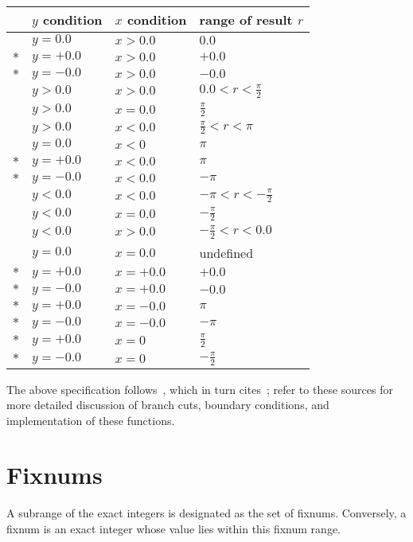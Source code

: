 \begin{center}
\begin{tabular}{clll}
& $y$ condition & $x$ condition & range of result $r$\\\hline
& $y = 0.0$ & $x > 0.0$ & $0.0$\\
$\ast$ & $y = +0.0$  & $x > 0.0$ & $+0.0$\\	
$\ast$ & $y = -0.0$ & $x > 0.0$ & $-0.0$\\
& $y > 0.0$ & $x > 0.0$ & $0.0 < r < \frac{\pi}{2}$\\
& $y > 0.0$ & $x = 0.0$ & $\frac{\pi}{2}$\\
& $y > 0.0$ & $x < 0.0$ & $\frac{\pi}{2} < r < \pi$\\
& $y = 0.0$ & $x < 0$ & $\pi$\\
$\ast$ & $y = +0.0$ & $x < 0.0$ & $\pi$\\
$\ast$ & $y = -0.0$ & $x < 0.0$ & $-\pi$\\	
&$y < 0.0$ & $x < 0.0$ & $-\pi< r< -\frac{\pi}{2}$\\
&$y < 0.0$ & $x = 0.0$ & $-\frac{\pi}{2}$\\
&$y < 0.0$ & $x > 0.0$ & $-\frac{\pi}{2} < r< 0.0$\\	
&$y = 0.0$ & $x = 0.0$ & undefined\\
$\ast$& $y = +0.0$ & $x = +0.0$ & $+0.0$\\
$\ast$& $y = -0.0$ & $x = +0.0$& $-0.0$\\
$\ast$& $y = +0.0$ & $x = -0.0$ & $\pi$\\
$\ast$& $y = -0.0$ & $x = -0.0$ & $-\pi$\\
$\ast$& $y = +0.0$ & $x = 0$ & $\frac{\pi}{2}$\\
$\ast$& $y = -0.0$ & $x = 0$	& $-\frac{\pi}{2}$
\end{tabular}
\end{center}

The above specification follows~\cite{CLtL}, which in turn
cites~\cite{Penfield81}; refer to these sources for more detailed
discussion of branch cuts, boundary conditions, and implementation of
these functions.

\section{Fixnums}

A subrange of the exact integers is designated as the set of fixnums.
Conversely, a fixnum is an exact integer whose value lies within this
fixnum range.

